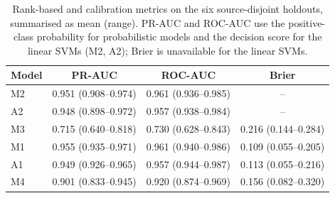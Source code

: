 
\begin{table}[!htbp]
\centering
\caption{Rank-based and calibration metrics on the six source-disjoint holdouts, summarised as mean (range). PR-AUC and ROC-AUC use the positive-class probability for probabilistic models and the decision score for the linear SVMs (M2, A2); Brier is unavailable for the linear SVMs.}
\label{tab:auc}
\begin{tabular}{lccc}
\hline\hline
Model & PR-AUC & ROC-AUC & Brier \\
\hline
M2 & 0.951 (0.908--0.974) & 0.961 (0.936--0.985) & -- \\
A2 & 0.948 (0.898--0.972) & 0.957 (0.938--0.984) & -- \\
M3 & 0.715 (0.640--0.818) & 0.730 (0.628--0.843) & 0.216 (0.144--0.284) \\
M1 & 0.955 (0.935--0.971) & 0.961 (0.940--0.986) & 0.109 (0.055--0.205) \\
A1 & 0.949 (0.926--0.965) & 0.957 (0.944--0.987) & 0.113 (0.055--0.216) \\
M4 & 0.901 (0.833--0.945) & 0.920 (0.874--0.969) & 0.156 (0.082--0.320) \\
\hline\hline
\end{tabular}
\end{table}